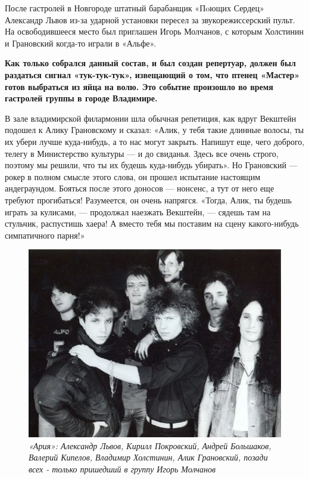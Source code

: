 \documentclass[16pt,a5paper,oneside]{book}
\begin{document}
После гастролей в Новгороде штатный барабанщик «Пoющих Сердец» Александр Львов из-за ударной установки пересел за
звукорежиссерский пульт. На освободившееся место был приглашен Игорь Молчанов, с которым Холстинин и Грановский когда-то
играли в «Альфе».

\textbf{Как только собрался данный состав, и был создан репертуар, должен был раздаться сигнал «тук-тук-тук», извещающий
о том, что птенец «Мастер» готов выбраться из яйца на волю. Это событие произошло во время гастролей группы в городе
Владимире.}

В зале владимирской филармонии шла обычная репетиция, как вдруг Векштейн подошел к Алику Грановскому и сказал: «Алик, у
тебя такие длинные волосы, ты их убери лучше куда-нибудь, а то нас могут закрыть. Напишут еще, чего доброго, телегу в
Министерство культуры — и до свиданья. Здесь все очень строго, поэтому мы решили, что ты их будешь куда-нибудь убирать».
Но Грановский — рокер в полном смысле этого слова, он прошел испытание настоящим андеграундом. Бояться после этого
доносов — нонсенс, а тут от него еще требуют прогибаться! Разумеется, он очень напрягся. «Тогда, Алик, ты будешь играть
за кулисами, — продолжал наезжать Векштейн, — сядешь там на стульчик, распустишь хаера! А вместо тебя мы поставим на
сцену какого-нибудь симпатичного парня!»

\begin{figure}
    \centering
    \includegraphics[scale=0.9]{Image14}
    \caption{\textit{
        «Ария»: Александр Львов, Кирилл Покровский, Андрей Большаков, Валерий Кипелов, Владимир Холстинин, Алик
        Грановский, позади всех - только пришедший в группу Игорь Молчанов
    }}
\end{figure}
\end{document}
